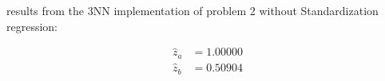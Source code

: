 results from the 3NN implementation of problem 2 without Standardization regression:

\begin{align*}
\hat z_a &= 1.00000 \\
\hat z_b &= 0.50904
\end{align*}